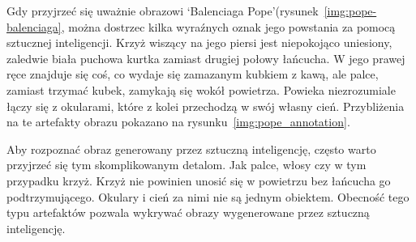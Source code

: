 Gdy przyjrzeć się uważnie obrazowi `Balenciaga Pope'(rysunek~\ref{img:pope-balenciaga}, można dostrzec kilka wyraźnych oznak jego powstania za pomocą sztucznej inteligencji.
Krzyż wiszący na jego piersi jest niepokojąco uniesiony, zaledwie biała puchowa kurtka zamiast drugiej połowy łańcucha.
W jego prawej ręce znajduje się coś, co wydaje się zamazanym kubkiem z kawą, ale palce, zamiast trzymać kubek, zamykają się wokół powietrza.
Powieka niezrozumiale łączy się z okularami, które z kolei przechodzą w swój własny cień.
Przybliżenia na te artefakty obrazu pokazano na rysunku~\ref{img:pope_annotation}.


Aby rozpoznać obraz generowany przez sztuczną inteligencję, często warto przyjrzeć się tym skomplikowanym detalom.
Jak palce, włosy czy w tym przypadku krzyż.
Krzyż nie powinien unosić się w powietrzu bez łańcucha go podtrzymującego.
Okulary i cień za nimi nie są jednym obiektem.
Obecność tego typu artefaktów pozwala wykrywać obrazy wygenerowane przez sztuczną inteligencję.
